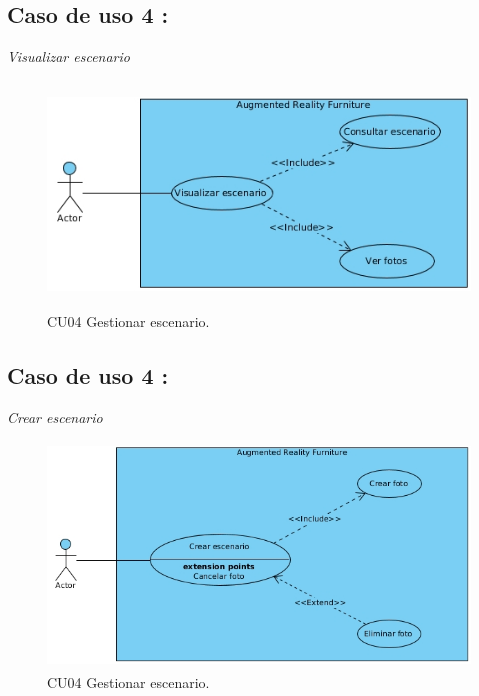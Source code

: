 \subsection{Caso de uso 4 :}\textit{Visualizar escenario} 
\vspace{5mm}
\begin{figure}[h!]
	\centering
	\includegraphics[width=12cm,height=6cm]{imagenes/analisis/visualizarEscenario.jpg}
	\caption{CU04 Gestionar escenario.}
	\label{fig:analogo}
\end{figure}

\subsection{Caso de uso 4 :}\textit{Crear escenario} 
\vspace{5mm}
\begin{figure}[h!]
	\centering
	\includegraphics[width=12cm,height=6cm]{imagenes/analisis/crearEscenario.jpg}
	\caption{CU04 Gestionar escenario.}
	\label{fig:analogo}
\end{figure}